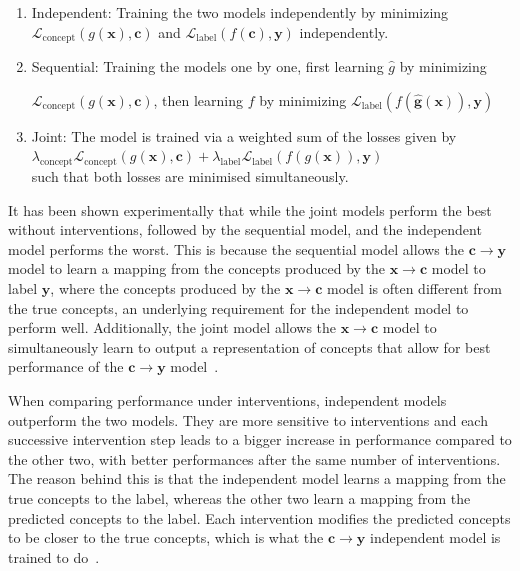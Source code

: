\documentclass[../main.tex]{subfiles}
\begin{document}
\begin{enumerate}
    \item Independent: Training the two models independently by minimizing
    $\mathcal{L}_{\text{concept}}(g(\mathbf{x}), \mathbf{c})$ and $\mathcal{L}_{\text{label}}(f(\mathbf{c}), \mathbf{y})$ independently.
    \item Sequential: Training the models one by one, first learning
    $\hat{g}$ by minimizing 
    
    $\mathcal{L}_{\text{concept}}(g(\mathbf{x}), \mathbf{c})$,
    then learning $f$ by minimizing $\mathcal{L}_{\text{label}}(f(\mathbf{\hat{g}(\mathbf{x})}), \mathbf{y})$
    \item Joint: The model is trained via a weighted sum of the losses given by \\ 
    $\lambda_{\text{concept}} \mathcal{L}_{\text{concept}}(g(\mathbf{x}), \mathbf{c}) + \lambda_{\text{label}} \mathcal{L}_{\text{label}}(f(g(\mathbf{x})), \mathbf{y})$ \\
    such that both losses are minimised simultaneously.
\end{enumerate}

It has been shown experimentally that while the joint models perform the best
without interventions, followed by the sequential model, and the independent model
performs the worst. This is because the sequential model allows the $\mathbf{c} \to \mathbf{y}$ 
model to learn a mapping from the concepts produced by the $\mathbf{x} \to \mathbf{c}$ model to
label $\mathbf{y}$, where the concepts produced by the $\mathbf{x} \to \mathbf{c}$ model is often different
from the true concepts, an underlying requirement for the independent model to perform well. Additionally,
the joint model allows the $\mathbf{x} \to \mathbf{c}$ model to simultaneously learn to output a representation
of concepts that allow for best performance of the $\mathbf{c} \to \mathbf{y}$ model~\cite{cbm}.

When comparing performance under interventions,
independent models outperform the two models.
They are more sensitive to interventions and each successive intervention step
leads to a bigger increase in performance compared to the other two,
with better performances after the same number of interventions.
The reason behind this
is that the independent model learns a mapping from the true concepts to the label,
whereas the other two learn a mapping from the predicted concepts to the label. Each intervention
modifies the predicted concepts to be closer to the true concepts, which is what the 
$\mathbf{c} \to \mathbf{y}$ independent model is trained to do~\cite{cbm}.
\end{document}
